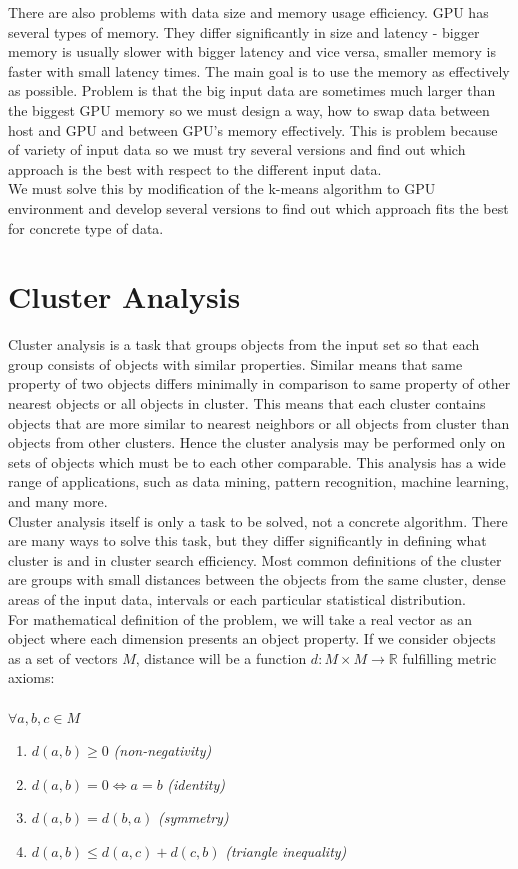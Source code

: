 There are also problems with data size and memory usage efficiency. GPU has several types of memory. They differ significantly in size and latency - bigger memory is usually slower with bigger latency and vice versa, smaller memory is faster with small latency times. The main goal is to use the memory as effectively as possible. Problem is that the big input data are sometimes much larger than the biggest GPU memory so we must design a way, how to swap data between host and GPU and between GPU's memory effectively. This is problem because of variety of input data so we must try several versions and find out which approach is the best with respect to the different input data.\\

We must solve this by modification of the k-means algorithm to GPU environment and develop several versions to find out which approach fits the best for concrete type of data.

\chapter{Cluster Analysis} \label{sec:clusteranalysis}
Cluster analysis is a task that groups objects from the input set so that each group consists of objects with similar properties. Similar means that same property of two objects differs minimally in comparison to same property of other nearest objects or all objects in cluster. This means that each cluster contains objects that are more similar to nearest neighbors or all objects from cluster than objects from other clusters. Hence the cluster analysis may be performed only on sets of objects which must be to each other comparable. This analysis has a wide range of applications, such as data mining, pattern recognition, machine learning, and many more.\\
Cluster analysis itself is only a task to be solved, not a concrete algorithm. There are many ways to solve this task, but they differ significantly in defining what cluster is and in cluster search efficiency. Most common definitions of the cluster are groups with small distances between the objects from the same cluster, dense areas of the input data, intervals or each particular statistical distribution.\\
For mathematical definition of the problem, we will take a real vector as an object where each dimension presents an object property. If we consider objects as a set of vectors $M$, distance will be a function $d:M\times M \to \mathbb{R}$ fulfilling metric axioms:\\ \\
$ \forall  a,b,c \in M$
\begin{enumerate}
\item $d(a,b)\geq 0$ \textit{(non-negativity)}
\item $d(a,b) = 0 \iff a = b$ \textit{(identity)}
\item $d(a,b) = d(b,a)$ \textit{(symmetry)}
\item$d(a,b) \leq d(a,c) + d(c,b)$ \textit{(triangle inequality)}
\end{enumerate}

